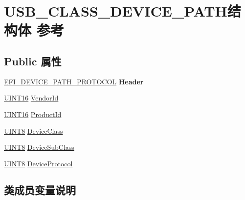 \hypertarget{struct_u_s_b___c_l_a_s_s___d_e_v_i_c_e___p_a_t_h}{}\section{U\+S\+B\+\_\+\+C\+L\+A\+S\+S\+\_\+\+D\+E\+V\+I\+C\+E\+\_\+\+P\+A\+T\+H结构体 参考}
\label{struct_u_s_b___c_l_a_s_s___d_e_v_i_c_e___p_a_t_h}
\subsection*{Public 属性}
\begin{DoxyCompactItemize}
\item 
\mbox{\label{struct_u_s_b___c_l_a_s_s___d_e_v_i_c_e___p_a_t_h_a526849af065bd858b2cf96ee91c12270}} 
\hyperlink{struct_e_f_i___d_e_v_i_c_e___p_a_t_h___p_r_o_t_o_c_o_l}{E\+F\+I\+\_\+\+D\+E\+V\+I\+C\+E\+\_\+\+P\+A\+T\+H\+\_\+\+P\+R\+O\+T\+O\+C\+OL} {\bfseries Header}
\item 
\hyperlink{_processor_bind_8h_a09f1a1fb2293e33483cc8d44aefb1eb1}{U\+I\+N\+T16} \hyperlink{struct_u_s_b___c_l_a_s_s___d_e_v_i_c_e___p_a_t_h_aeecbb26edc08c1f536f1e58a1b4e8e07}{Vendor\+Id}
\item 
\hyperlink{_processor_bind_8h_a09f1a1fb2293e33483cc8d44aefb1eb1}{U\+I\+N\+T16} \hyperlink{struct_u_s_b___c_l_a_s_s___d_e_v_i_c_e___p_a_t_h_ab28b7fc4217d4656f113d62b2b4e1bba}{Product\+Id}
\item 
\hyperlink{_processor_bind_8h_ab27e9918b538ce9d8ca692479b375b6a}{U\+I\+N\+T8} \hyperlink{struct_u_s_b___c_l_a_s_s___d_e_v_i_c_e___p_a_t_h_a5c2922186ea9e561d8531e3a3ab05b79}{Device\+Class}
\item 
\hyperlink{_processor_bind_8h_ab27e9918b538ce9d8ca692479b375b6a}{U\+I\+N\+T8} \hyperlink{struct_u_s_b___c_l_a_s_s___d_e_v_i_c_e___p_a_t_h_a3a7fe31ed5ed4ecf4346b2ac8366a3e6}{Device\+Sub\+Class}
\item 
\hyperlink{_processor_bind_8h_ab27e9918b538ce9d8ca692479b375b6a}{U\+I\+N\+T8} \hyperlink{struct_u_s_b___c_l_a_s_s___d_e_v_i_c_e___p_a_t_h_ae094f0d8da26ff97bb7b887992383a8f}{Device\+Protocol}
\end{DoxyCompactItemize}


\subsection{类成员变量说明}
\mbox{\label{struct_u_s_b___c_l_a_s_s___d_e_v_i_c_e___p_a_t_h_a5c2922186ea9e561d8531e3a3ab05b79}} 
